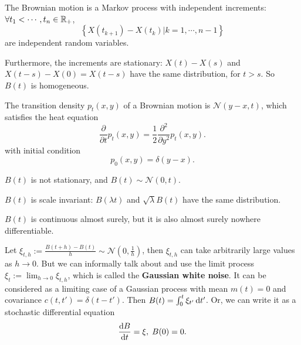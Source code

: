 \begin{proposition}
    The Brownian motion is a Markov process with independent increments: $\forall t_1 < \cdots, t_n \in \mathbb{R}_+$, 
    \begin{equation*}
        \left\{ X(t_{k+1}) - X(t_k) | k = 1, \cdots, n-1 \right\}
    \end{equation*}
    are independent random variables.

    Furthermore, the increments are stationary: $X(t) - X(s)$ and $X(t-s) - X(0) = X(t-s)$ have the same distribution, for $t > s$. So $B(t)$ is homogeneous.
\end{proposition}

\begin{proposition}
    The transition density $p_t(x,y)$ of a Brownian motion is $\mathcal{N}(y-x, t)$, which satisfies the heat equation 
    \begin{equation*}
        \frac{\partial}{\partial t} p_t(x,y) = \frac{1}{2} \frac{\partial^2}{\partial y^2} p_t(x,y).
    \end{equation*}
    with initial condition 
    \begin{equation*}
        p_0(x,y) = \delta (y-x).
    \end{equation*}
\end{proposition}

\begin{remark}
    $B(t)$ is not stationary, and $B(t) \sim \mathcal{N}(0, t)$.
\end{remark}

\begin{proposition}
    $B(t)$ is scale invariant: $B(\lambda t)$ and $\sqrt{\lambda} B(t)$ have the same distribution.
\end{proposition}

\begin{proposition}
    $B(t)$ is continuous almost surely, but it is also almost surely nowhere differentiable.
\end{proposition}

Let $\xi_{t, h} := \frac{B(t+h) - B(t)}{h} \sim \mathcal{N} (0, \frac{1}{h})$, then $\xi_{t, h}$ can take arbitrarily large values as $h \to 0$. But we can informally talk about and use the limit process $\xi_t:=\lim_{h\to 0} \xi_{t,h}$, which is called the \textbf{Gaussian white noise}. It can be considered as a limiting case of a Gaussian process with mean $m(t) = 0$ and covariance $c(t, t') = \delta(t-t')$. Then $B(t) = \int_0^t \xi_{t'} \dif t'$. Or, we can write it as a stochastic differential equation 
\begin{equation*}
    \frac{\dif B}{\dif t} = \xi, \; B(0) = 0.
\end{equation*}

